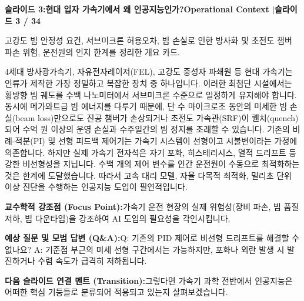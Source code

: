 \documentclass[11pt,a4paper]{article}
\begin{document}
\clearpage
\hypertarget{slide.3}{}
{}
\noindent\begin{tcolorbox}[colback=navy,colframe=navy,left=6pt,right=6pt,top=3pt,bottom=3pt,boxrule=0pt,arc=2pt]
{\large\bfseries\color{white}슬라이드 3:\enspace 현대 입자 가속기에서 왜 인공지능인가?}\hfill{\footnotesize\bfseries\color{white!85!lightbg}Operational Context \enspace$|$\enspace 슬라이드 3 / 34}
\end{tcolorbox}
\vspace{0.2em}
\begin{tcolorbox}[colback=lightbg,colframe=bordergray,title={\footnotesize\bfseries\color{darkgray}슬라이드 시각 구성 요약},fontupper=\small,left=6pt,right=6pt,top=2.5pt,bottom=2.5pt,boxrule=0.6pt,arc=2.5pt]
고강도 빔 안정성 요건, 서브미크론 허용오차, 빔 손실로 인한 방사화 및 초전도 챔버 파손 위험, 운전원의 인지 한계를 정리한 개요 카드.
\end{tcolorbox}
\vspace{0.2em}
\begin{tcolorbox}[colback=white,colframe=primaryblue,title={\footnotesize\bfseries\color{white}발표자 구두 대본 (Spoken Script)},fontupper=\small,left=6pt,right=6pt,top=3pt,bottom=3pt,boxrule=0.8pt,arc=2.5pt]
4세대 방사광가속기, 자유전자레이저(FEL), 고강도 중성자 파쇄원 등 현대 가속기는 인류가 제작한 가장 정밀하고 복잡한 장치 중 하나입니다. 이러한 최첨단 시설에서는 횡방향 빔 궤도를 수백 나노미터에서 서브미크론 수준으로 일정하게 유지해야 합니다. 동시에 메가와트급 빔 에너지를 다루기 때문에, 단 수 마이크로초 동안의 미세한 빔 손실(beam loss)만으로도 진공 챔버가 손상되거나 초전도 가속관(SRF)이 퀜치(quench)되어 수억 원 이상의 운영 손실과 수주일간의 빔 정지를 초래할 수 있습니다. 기존의 비례-적분(PI) 및 선형 피드백 제어기는 가속기 시스템이 선형이고 시불변이라는 가정에 의존합니다. 하지만 실제 가속기 전자석은 자기 포화, 히스테리시스, 열적 드리프트 등 강한 비선형성을 지닙니다. 수백 개의 제어 변수를 인간 운전원이 수동으로 최적화하는 것은 한계에 도달했습니다. 따라서 고속 대리 모델, 자율 다목적 최적화, 밀리초 단위 이상 진단을 수행하는 인공지능 도입이 필연적입니다.
\end{tcolorbox}
\vspace{0.2em}
\begin{tcolorbox}[colback=lightbg,colframe=bordergray,left=6pt,right=6pt,top=3pt,bottom=3pt,boxrule=0.6pt,arc=2.5pt]
\small
\noindent\textbf{\color{navy}교수학적 강조점 (Focus Point):}\enspace 가속기 운전 현장의 실제 위험성(장비 파손, 빔 품질 저하, 빔 다운타임)을 강조하여 AI 도입의 필요성을 각인시킵니다.\par\vspace{0.3em}
\noindent\textbf{\color{successgreen}예상 질문 및 모범 답변 (Q\&A):}\enspace Q: 기존의 PID 제어로 비선형 드리프트를 해결할 수 없나요? A: 기준점 부근의 미세 선형 구간에서는 가능하지만, 포화나 외란 발생 시 발진하거나 수렴 속도가 급격히 저하됩니다.\par\vspace{0.3em}
\noindent\textbf{\color{accent}다음 슬라이드 연결 멘트 (Transition):}\enspace 그렇다면 가속기 과학 전반에서 인공지능은 어떠한 핵심 기둥들로 분류되어 적용되고 있는지 살펴보겠습니다.
\end{tcolorbox}
\end{document}
